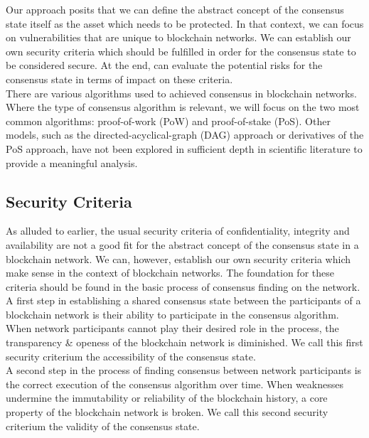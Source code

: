 \documentclass[11pt,a4paper]{article}
\begin{document}
Our approach posits that we can define the abstract concept of the consensus state itself as the asset which needs to be protected. In that context, we can focus on vulnerabilities that are unique to blockchain networks. We can establish our own security criteria which should be fulfilled in order for the consensus state to be considered secure. At the end, can evaluate the potential risks for the consensus state in terms of impact on these criteria.\\

There are various algorithms used to achieved consensus in blockchain networks. Where the type of consensus algorithm is relevant, we will focus on the two most common algorithms: proof-of-work (PoW) and proof-of-stake (PoS). Other models, such as the directed-acyclical-graph (DAG) approach or derivatives of the PoS approach, have not been explored in sufficient depth in scientific literature to provide a meaningful analysis.\\

\subsection{Security Criteria}

As alluded to earlier, the usual security criteria of confidentiality, integrity and availability are not a good fit for the abstract concept of the consensus state in a blockchain network. We can, however, establish our own security criteria which make sense in the context of blockchain networks. The foundation for these criteria should be found in the basic process of consensus finding on the network.\\

A first step in establishing a shared consensus state between the participants of a blockchain network is their ability to participate in the consensus algorithm. When network participants cannot play their desired role in the process, the transparency \& openess of the blockchain network is diminished. We call this first security criterium the accessibility of the consensus state.\\

A second step in the process of finding consensus between network participants is the correct execution of the consensus algorithm over time. When weaknesses undermine the immutability or reliability of the blockchain history, a core property of the blockchain network is broken. We call this second security criterium the validity of the consensus state.\\
\end{document}
